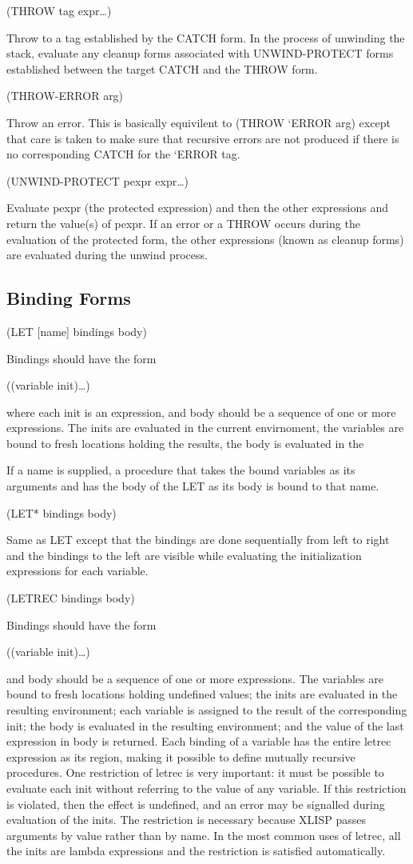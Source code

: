 \documentclass[11pt]{article}
\begin{document}
(THROW tag expr\ldots{})

Throw to a tag established by the CATCH form.  In the process of
unwinding the stack, evaluate any cleanup forms associated with
UNWIND-PROTECT forms established between the target CATCH and the THROW
form.

(THROW-ERROR arg)

Throw an error.  This is basically equivilent to (THROW ‘ERROR arg)
except that care is taken to make sure that recursive errors are not
produced if there is no corresponding CATCH for the ‘ERROR tag.

(UNWIND-PROTECT pexpr expr\ldots{})

Evaluate pexpr (the protected expression) and then the other expressions
and return the value(s) of pexpr.  If an error or a THROW occurs during
the evaluation of the protected form, the other expressions (known as
cleanup forms) are evaluated during the unwind process.
\subsection{Binding Forms}
\label{sec-1-8}

(LET [name] bindings body)

Bindings should have the form

((variable init)\ldots{})

where each init is an expression, and body should be a sequence of one
or more expressions. The inits are evaluated in the current envirnoment,
the variables are bound to fresh locations holding the results, the body
is evaluated in the

If a name is supplied, a procedure that takes the bound variables as its
arguments and has the body of the LET as its body is bound to that name.

(LET* bindings body)

Same as LET except that the bindings are done sequentially from left to
right and the bindings to the left are visible while evaluating the
initialization expressions for each variable.

(LETREC bindings body)

Bindings should have the form

((variable init)\ldots{})

and body should be a sequence of one or more expressions. The variables
are bound to fresh locations holding undefined values; the inits are
evaluated in the resulting environment; each variable is assigned to the
result of the corresponding init; the body is evaluated in the resulting
environment; and the value of the last expression in body is
returned. Each binding of a variable has the entire letrec expression as
its region, making it possible to define mutually recursive
procedures. One restriction of letrec is very important: it must be
possible to evaluate each init without referring to the value of any
variable. If this restriction is violated, then the effect is undefined,
and an error may be signalled during evaluation of the inits. The
restriction is necessary because XLISP passes arguments by value rather
than by name. In the most common uses of letrec, all the inits are
lambda expressions and the restriction is satisfied automatically.
\end{document}
